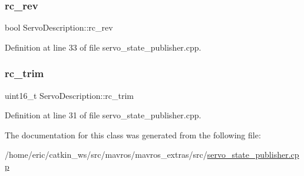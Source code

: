 \mbox{\label{classServoDescription_ace31258fe387d6edb10b35e31adffd93}} 
\subsubsection{\texorpdfstring{rc\_rev}{rc\_rev}}
{\footnotesize\ttfamily bool Servo\+Description\+::rc\+\_\+rev}



Definition at line 33 of file servo\+\_\+state\+\_\+publisher.\+cpp.

\mbox{\label{classServoDescription_a53f8532ce38683c545375dbc5e58d2e2}} 
\subsubsection{\texorpdfstring{rc\_trim}{rc\_trim}}
{\footnotesize\ttfamily uint16\+\_\+t Servo\+Description\+::rc\+\_\+trim}



Definition at line 31 of file servo\+\_\+state\+\_\+publisher.\+cpp.



The documentation for this class was generated from the following file\+:\begin{DoxyCompactItemize}
\item 
/home/eric/catkin\+\_\+ws/src/mavros/mavros\+\_\+extras/src/\mbox{\hyperlink{servo__state__publisher_8cpp}{servo\+\_\+state\+\_\+publisher.\+cpp}}\end{DoxyCompactItemize}
